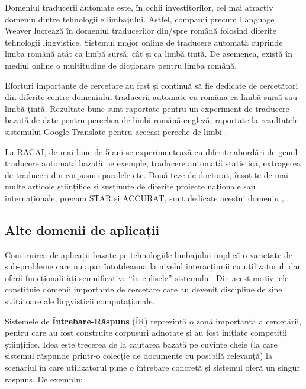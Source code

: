 \documentclass[]{../../metanetpaper}
\begin{document}
\begin{multicols}{2}
Domeniul traducerii automate este, în ochii investitorilor, cel mai atractiv domeniu dintre tehnologiile limbajului. Astfel, companii precum Language Weaver lucrează în domeniul traducerilor din/spre română folosind diferite tehnologii lingvistice. Sistemul major online de traducere automată cuprinde limba română atât ca limbă sursă, cât și ca limbă țintă. De asemenea, există în mediul online o multitudine de dicționare pentru limba română.

Eforturi importante de cercetare au fost și continuă să fie dedicate de cercetători din diferite centre domeniului traducerii automate cu româna ca limbă sursă sau limbă țintă. Rezultate bune sunt raportate pentru un experiment de traducere bazată de date pentru perechea de limbi română-engleză, raportate la rezultatele sistemului Google Translate pentru aceeași pereche de limbi \cite{munteanu}. 

La RACAI, de mai bine de 5 ani se experimentează cu diferite abordări de genul traducere automată bazată pe exemple, traducere automată statistică, extragerea de traduceri din corpusuri paralele etc. Două teze de doctorat, însoțite de mai multe articole științifice și susținute de diferite proiecte naționale sau internaționale, precum STAR și ACCURAT, sunt dedicate acestui domeniu \cite{tufisMT}, \cite{irimia}.

\subsection{Alte domenii de aplicații}

Construirea de aplicații bazate pe tehnologiile limbajului implică o varietate de sub-probleme care nu apar întotdeauna la nivelul interacțiunii cu utilizatorul, dar oferă funcționalități semnificative “în culisele” sistemului. Din acest motiv, ele constituie domenii importante de cercetare care au devenit discipline de sine stătătoare ale lingvisticii computaționale. 

Sistemele de \textbf{Întrebare-Răspuns} (ÎR) reprezintă o zonă importantă a cercetării, pentru care au fost construite corpusuri adnotate și au fost inițiate competiții științifice. Idea este trecerea de la căutarea bazată pe cuvinte cheie (la care sistemul răspunde printr-o colecție de documente cu posibilă relevanță) la scenariul în care utilizatorul pune o întrebare concretă și sistemul oferă un singur răspuns. De exemplu:


\end{multicols}
\end{document}
